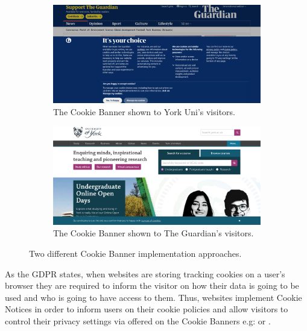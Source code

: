 \documentclass[../main.tex]{subfiles}
\begin{document}
\begin{figure}[ht!]
    \centering
    \begin{subfigure}[b]{0.45\textwidth}
        \includegraphics[width=\textwidth]{images/intro/york}
        \caption{The  Cookie Banner shown to York Uni's visitors.}
        \label{fig:intro_cookie_york}
    \end{subfigure}
    \hfill
    \begin{subfigure}[b]{0.45\textwidth}
        \includegraphics[width=\textwidth]{images/intro/guardian}
        \caption{The  Cookie Banner shown to The Guardian's visitors.}
        \label{fig:intro_cookie_guardian}
    \end{subfigure}
    \caption{Two different Cookie Banner implementation approaches.}
    \label{fig:intro_cookie}
\end{figure}

As the GDPR states, when websites are storing tracking cookies on a user’s browser they are required to inform the visitor on how their data is going to be used and who is going to have access to them. Thus, websites implement Cookie Notices in order to inform users on their cookie policies and allow visitors to control their privacy settings via  offered on the Cookie Banners e.g:  or .
\end{document}
